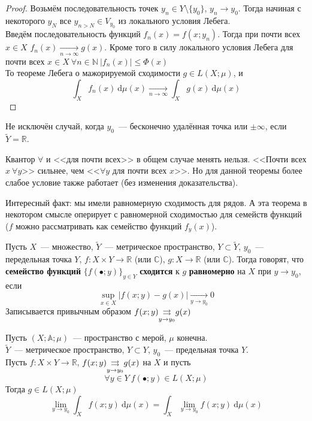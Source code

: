 \documentclass{article}
\begin{document}
    \begin{proof}
        Возьмём последовательность точек $y_n\in Y\setminus\{y_0\}$, $y_n\to y_0$. Тогда начиная с некоторого $y_N$ все $y_{n>N}\in V_{y_0}$ из локального условия Лебега.\\
        Введём последовательность функций $f_n(x)=f(x;y_n)$. Тогда при почти всех $x\in X$ $f_n(x)\underset{n\to\infty}\rightarrow g(x)$. Кроме того в силу локального условия Лебега для почти всех $x\in X~\forall n\in\mathbb N~|f_n(x)|\leqslant\Phi(x)$\\
        То теореме Лебега о мажорируемой сходимости $g\in L(X;\mu)$, и
        $$
        \int_Xf_n(x)~\mathrm d\mu(x)\underset{n\to\infty}\longrightarrow\int_Xg(x)~\mathrm d\mu(x)
        $$
    \end{proof}
    \begin{remark}
        Не исключён случай, когда $y_0$~--- бесконечно удалённая точка или $\pm\infty$, если $\tilde Y=\mathbb R$.
    \end{remark}
    \begin{remark}
        Квантор $\forall$ и <<для почти всех>> в общем случае менять нельзя. <<Почти всех $x~\forall y$>> сильнее, чем <<$\forall y$ для почти всех $x$>>. Но для данной теоремы более слабое условие также работает (без изменения доказательства).
    \end{remark}
    \begin{remark}
        Интересный факт: мы имели равномерную сходимость для рядов. А эта теорема в некотором смысле оперирует с равномерной сходимостью для семейств функций ($f$ можно рассматривать как семейство функций $f_y(x)$).
    \end{remark}
    \begin{definition}
        Пусть $X$~--- множество, $\tilde Y$~--- метрическое пространство, $Y\subset\tilde Y$, $y_0$~--- передельная точка $Y$, $f\colon X\times Y\to\mathbb R$ (или $\mathbb C$), $g\colon X\to\mathbb R$ (или $\mathbb C$). Тогда говорят, что \textbf{семейство функций} $\{f(\bullet;y)\}_{y\in Y}$ \textbf{сходится} к $g$ \textbf{равномерно} на $X$ при $y\to y_0$, если
        $$
        \sup\limits_{x\in X}|f(x;y)-g(x)|\underset{y\to y_0}\longrightarrow0
        $$
        Записывается привычным образом $f(x;y)\underset{y\to y_0}{\operatorname{\rightrightarrows}} g(x)$
    \end{definition}
    \begin{corollary}
        \label{Предельный переход по параметру}
        Пусть $(X;\mathbb A;\mu)$~--- пространство с мерой, $\mu$ конечна.\\
        $\tilde Y$~--- метрическое пространство, $Y\subset Y$, $y_0$~--- предельная точка $Y$.\\
        Пусть $f\colon X\times Y\to\mathbb R$, $f(x;y)\underset{y\to y_0}{\operatorname{\rightrightarrows}} g(x)$ на $X$ и пусть
        $$\forall y\in Y~f(\bullet;y)\in L(X;\mu)$$
        Тогда $g\in L(X;\mu)$
        $$
        \lim\limits_{y\to y_0}\int_Xf(x;y)~\mathrm d\mu(x)=\int_X\lim\limits_{y\to y_0}f(x;y)~\mathrm d\mu(x)
        $$
    \end{corollary}
\end{document}
